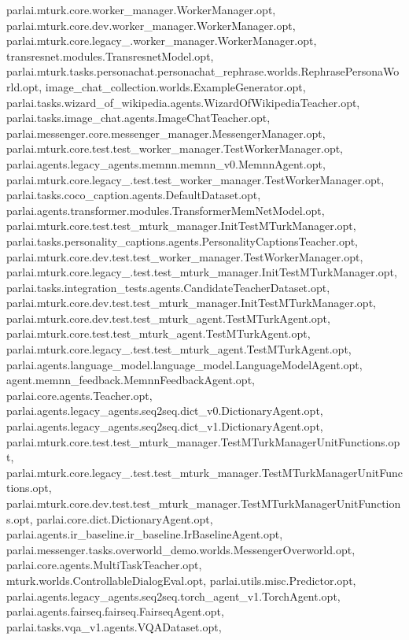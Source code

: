 parlai.\+mturk.\+core.\+worker\+\_\+manager.\+Worker\+Manager.\+opt, parlai.\+mturk.\+core.\+dev.\+worker\+\_\+manager.\+Worker\+Manager.\+opt, parlai.\+mturk.\+core.\+legacy\+\_.\+worker\+\_\+manager.\+Worker\+Manager.\+opt, transresnet.\+modules.\+Transresnet\+Model.\+opt, parlai.\+mturk.\+tasks.\+personachat.\+personachat\+\_\+rephrase.\+worlds.\+Rephrase\+Persona\+World.\+opt, image\+\_\+chat\+\_\+collection.\+worlds.\+Example\+Generator.\+opt, parlai.\+tasks.\+wizard\+\_\+of\+\_\+wikipedia.\+agents.\+Wizard\+Of\+Wikipedia\+Teacher.\+opt, parlai.\+tasks.\+image\+\_\+chat.\+agents.\+Image\+Chat\+Teacher.\+opt, parlai.\+messenger.\+core.\+messenger\+\_\+manager.\+Messenger\+Manager.\+opt, parlai.\+mturk.\+core.\+test.\+test\+\_\+worker\+\_\+manager.\+Test\+Worker\+Manager.\+opt, parlai.\+agents.\+legacy\+\_\+agents.\+memnn.\+memnn\+\_\+v0.\+Memnn\+Agent.\+opt, parlai.\+mturk.\+core.\+legacy\+\_.\+test.\+test\+\_\+worker\+\_\+manager.\+Test\+Worker\+Manager.\+opt, parlai.\+tasks.\+coco\+\_\+caption.\+agents.\+Default\+Dataset.\+opt, parlai.\+agents.\+transformer.\+modules.\+Transformer\+Mem\+Net\+Model.\+opt, parlai.\+mturk.\+core.\+test.\+test\+\_\+mturk\+\_\+manager.\+Init\+Test\+M\+Turk\+Manager.\+opt, parlai.\+tasks.\+personality\+\_\+captions.\+agents.\+Personality\+Captions\+Teacher.\+opt, parlai.\+mturk.\+core.\+dev.\+test.\+test\+\_\+worker\+\_\+manager.\+Test\+Worker\+Manager.\+opt, parlai.\+mturk.\+core.\+legacy\+\_.\+test.\+test\+\_\+mturk\+\_\+manager.\+Init\+Test\+M\+Turk\+Manager.\+opt, parlai.\+tasks.\+integration\+\_\+tests.\+agents.\+Candidate\+Teacher\+Dataset.\+opt, parlai.\+mturk.\+core.\+dev.\+test.\+test\+\_\+mturk\+\_\+manager.\+Init\+Test\+M\+Turk\+Manager.\+opt, parlai.\+mturk.\+core.\+dev.\+test.\+test\+\_\+mturk\+\_\+agent.\+Test\+M\+Turk\+Agent.\+opt, parlai.\+mturk.\+core.\+test.\+test\+\_\+mturk\+\_\+agent.\+Test\+M\+Turk\+Agent.\+opt, parlai.\+mturk.\+core.\+legacy\+\_.\+test.\+test\+\_\+mturk\+\_\+agent.\+Test\+M\+Turk\+Agent.\+opt, parlai.\+agents.\+language\+\_\+model.\+language\+\_\+model.\+Language\+Model\+Agent.\+opt, agent.\+memnn\+\_\+feedback.\+Memnn\+Feedback\+Agent.\+opt, parlai.\+core.\+agents.\+Teacher.\+opt, parlai.\+agents.\+legacy\+\_\+agents.\+seq2seq.\+dict\+\_\+v0.\+Dictionary\+Agent.\+opt, parlai.\+agents.\+legacy\+\_\+agents.\+seq2seq.\+dict\+\_\+v1.\+Dictionary\+Agent.\+opt, parlai.\+mturk.\+core.\+test.\+test\+\_\+mturk\+\_\+manager.\+Test\+M\+Turk\+Manager\+Unit\+Functions.\+opt, parlai.\+mturk.\+core.\+legacy\+\_.\+test.\+test\+\_\+mturk\+\_\+manager.\+Test\+M\+Turk\+Manager\+Unit\+Functions.\+opt, parlai.\+mturk.\+core.\+dev.\+test.\+test\+\_\+mturk\+\_\+manager.\+Test\+M\+Turk\+Manager\+Unit\+Functions.\+opt, parlai.\+core.\+dict.\+Dictionary\+Agent.\+opt, parlai.\+agents.\+ir\+\_\+baseline.\+ir\+\_\+baseline.\+Ir\+Baseline\+Agent.\+opt, parlai.\+messenger.\+tasks.\+overworld\+\_\+demo.\+worlds.\+Messenger\+Overworld.\+opt, parlai.\+core.\+agents.\+Multi\+Task\+Teacher.\+opt, mturk.\+worlds.\+Controllable\+Dialog\+Eval.\+opt, parlai.\+utils.\+misc.\+Predictor.\+opt, parlai.\+agents.\+legacy\+\_\+agents.\+seq2seq.\+torch\+\_\+agent\+\_\+v1.\+Torch\+Agent.\+opt, parlai.\+agents.\+fairseq.\+fairseq.\+Fairseq\+Agent.\+opt, parlai.\+tasks.\+vqa\+\_\+v1.\+agents.\+V\+Q\+A\+Dataset.\+opt, 